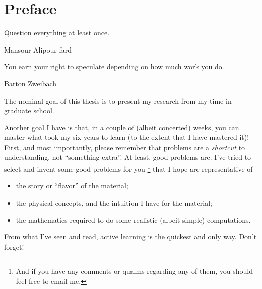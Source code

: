 \section*{Preface}

\epigraph{Question everything at least once.}{Mansour Alipour-fard}

\epigraph{You earn your right to speculate depending on how much work you do.}{Barton Zweibach}


The nominal goal of this thesis is to present my research from my time in graduate school.

Another goal I have is that, in a couple of (albeit concerted) weeks, you can master what took my six years to learn (to the extent that I have mastered it)!
%
First, and most importantly, please remember that problems are a \textit{shortcut} to understanding, not ``something extra''.
%
At least, good problems are.
%
I've tried to select and invent some good problems for you%
\footnote{
    And if you have any comments or qualms regarding any of them, you should feel free to email me.
}
%
that I hope are representative of
\begin{itemize}
    \item
        the story or ``flavor'' of the material;

    \item
        the physical concepts, and the intuition I have for the material;

    \item
        the mathematics required to do some realistic (albeit simple) computations.
\end{itemize}
%
From what I've seen and read, active learning is the quickest and only way.
%
Don't forget!

